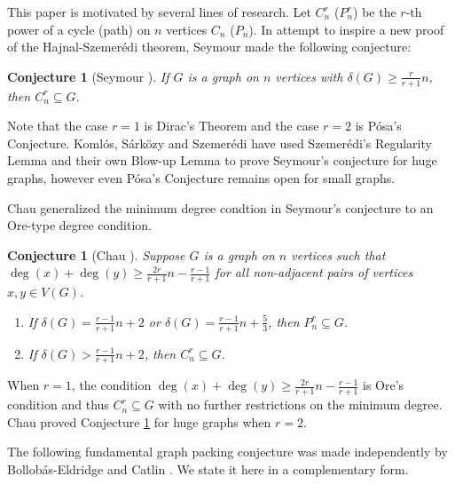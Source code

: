 \documentclass[oneside,12pt]{memoir}
\newtheorem{conjecture}[theorem]{Conjecture}
\begin{document}
This paper is motivated by several lines of research. Let $C_n^r$ ($P_n^r$) be the $r$-th power of a cycle (path) on $n$
vertices $C_n$ ($P_n$). In attempt to inspire a new proof of the Hajnal-Szemer\'edi theorem, Seymour made the following conjecture:
\begin{conjecture}[Seymour \cite{Sey}]
If $G$ is a graph on $n$ vertices with $\delta(G)\geq \frac{r}{r+1}n$, then $C_n^r\subseteq G$.
\end{conjecture}
Note that the case $r=1$ is Dirac's Theorem and the case $r=2$ is P\'osa's Conjecture.  Koml\'os, S\'ark\"{o}zy and Szemer\'edi \cite{KSSps,KSSs} have used Szemer\'edi's Regularity Lemma \cite{Sz} and their own Blow-up Lemma \cite{KSSbu} to prove Seymour's conjecture for huge graphs, however even P\'osa's Conjecture remains open for small graphs.

Chau generalized the minimum degree condtion in Seymour's conjecture to an Ore-type degree condition.
\begin{conjecture}[Chau \cite{C}]
\label{Ore-seymour}Suppose $G$ is a graph on $n$ vertices such that $\deg(x)+\deg(y)\geq \frac{2r}{r+1}n-\frac{r-1}{r+1}$ for all non-adjacent pairs of vertices $x,y\in V(G)$. 
\begin{enumerate}
\item If $\delta(G)=\frac{r-1}{r+1}n+2$ or $\delta(G)=\frac{r-1}{r+1}n+\frac{5}{3}$, then $P_n^r\subseteq G$.
\item If $\delta(G)>\frac{r-1}{r+1}n+2$, then $C_n^r\subseteq G$.
\end{enumerate}
\end{conjecture}
When $r=1$, the condition $\deg(x)+\deg(y)\geq \frac{2r}{r+1}n-\frac{r-1}{r+1}$ is Ore's condition and thus $C_n^r\subseteq G$ with no further restrictions on the minimum degree.  Chau proved Conjecture \ref{Ore-seymour} for huge graphs when $r=2$.


The following fundamental graph packing conjecture was made independently by Bollob\'as-Eldridge \cite{BE1} and Catlin \cite{Cat}.  We state it here in a complementary form.
\end{document}
